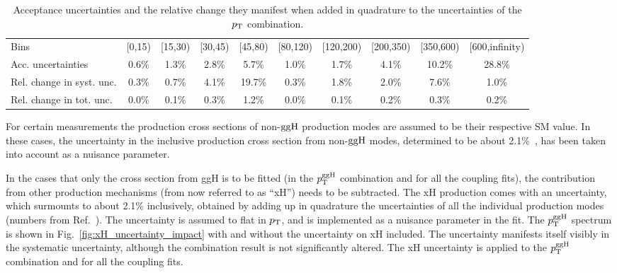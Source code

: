 \begin{table}[h!]
\footnotesize
\begin{center}
\hspace*{-1cm}
\begin{tabular}{lccccccccc}
Bins                      & [0,15) & [15,30) & [30,45) & [45,80) & [80,120) & [120,200) & [200,350) & [350,600) & [600,infinity)  \\
Acc. uncertainties        & 0.6\%   & 1.3\%    & 2.8\%    & 5.7\%    & 1.0\%     & 1.7\%      & 4.1\%      & 10.2\%     & 28.8\%  \\
Rel. change in syst. unc. & 0.3\%   & 0.7\%    & 4.1\%    & 19.7\%   & 0.3\%     & 1.8\%      & 2.0\%      & 7.6\%      & 1.0\%   \\
Rel. change in tot. unc.  & 0.0\%   & 0.1\%    & 0.3\%    & 1.2\%    & 0.0\%     & 0.1\%      & 0.2\%      & 0.3\%      & 0.2\%   \\
\end{tabular}
\end{center}
\caption{
    Acceptance uncertainties and the relative change they manifest when added in quadrature to the uncertainties of the $p_\mathrm{T}$ combination.
    }
\label{tab:accuncertainties}
\end{table}



For certain measurements the production cross sections of non-$\mathrm{g}\mathrm{g}\mathrm{H}$ production modes are assumed to be their respective SM value.
% 
In these cases, the uncertainty in the inclusive production cross section from non-$\mathrm{g}\mathrm{g}\mathrm{H}$ modes, determined to be about 2.1\%~\cite{deFlorian:2016spz}, has been taken into account as a nuisance parameter.
% 


% 
In the cases that only the cross section from ggH is to be fitted (in the $p_\mathrm{T}^\text{ggH}$ combination and for all the coupling fits), the contribution from other production mechanisms (from now referred to as ``xH'') needs to be subtracted.
% 
The xH production comes with an uncertainty, which surmounts to about 2.1\% inclusively, obtained by adding up in quadrature the uncertainties of all the individual production modes (numbers from Ref.~\cite{deFlorian:2016spz}).
% 
The uncertainty is assumed to flat in $p_\mathrm{T}$, and is implemented as a nuisance parameter in the fit.
% 
The $p_\mathrm{T}^\text{ggH}$ spectrum is shown in Fig.~\ref{fig:xH_uncertainty_impact} with and without the uncertainty on xH included.
% 
The uncertainty manifests itself visibly in the systematic uncertainty, although the combination result is not significantly altered.
% 
The xH uncertainty is applied to the $p_\mathrm{T}^\text{ggH}$ combination and for all the coupling fits.


